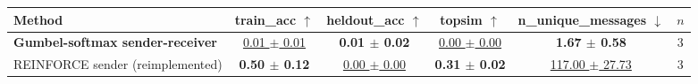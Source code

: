 \begin{tabular}{lccccc}
\toprule
Method & train\_acc $\uparrow$ & heldout\_acc $\uparrow$ & topsim $\uparrow$ & n\_unique\_messages $\downarrow$ & $n$ \\
\midrule
\textbf{Gumbel-softmax sender-receiver} & \underline{0.01 $\pm$ 0.01} & \textbf{0.01 $\pm$ 0.02} & \underline{0.00 $\pm$ 0.00} & \textbf{1.67 $\pm$ 0.58} & 3 \\
REINFORCE sender (reimplemented) & \textbf{0.50 $\pm$ 0.12} & \underline{0.00 $\pm$ 0.00} & \textbf{0.31 $\pm$ 0.02} & \underline{117.00 $\pm$ 27.73} & 3 \\
\bottomrule
\end{tabular}
